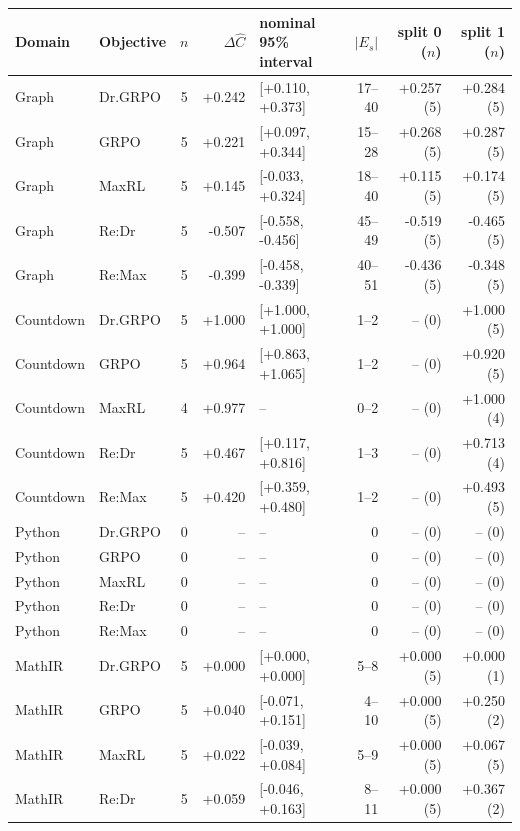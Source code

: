 \begin{table}[!htbp]
\centering
\scriptsize
\setlength{\tabcolsep}{3pt}
\begin{tabular}{@{}llcrlrrr@{}}
\toprule
Domain & Objective & $n$ & $\Delta\widehat C$ & nominal 95\% interval & $|E_s|$ & split 0 ($n$) & split 1 ($n$) \\
\midrule
Graph & Dr.GRPO & 5 & +0.242 & [+0.110, +0.373] & 17--40 & +0.257 (5) & +0.284 (5) \\
Graph & GRPO & 5 & +0.221 & [+0.097, +0.344] & 15--28 & +0.268 (5) & +0.287 (5) \\
Graph & MaxRL & 5 & +0.145 & [-0.033, +0.324] & 18--40 & +0.115 (5) & +0.174 (5) \\
Graph & Re:Dr & 5 & -0.507 & [-0.558, -0.456] & 45--49 & -0.519 (5) & -0.465 (5) \\
Graph & Re:Max & 5 & -0.399 & [-0.458, -0.339] & 40--51 & -0.436 (5) & -0.348 (5) \\
Countdown & Dr.GRPO & 5 & +1.000 & [+1.000, +1.000] & 1--2 & -- (0) & +1.000 (5) \\
Countdown & GRPO & 5 & +0.964 & [+0.863, +1.065] & 1--2 & -- (0) & +0.920 (5) \\
Countdown & MaxRL & 4 & +0.977 & -- & 0--2 & -- (0) & +1.000 (4) \\
Countdown & Re:Dr & 5 & +0.467 & [+0.117, +0.816] & 1--3 & -- (0) & +0.713 (4) \\
Countdown & Re:Max & 5 & +0.420 & [+0.359, +0.480] & 1--2 & -- (0) & +0.493 (5) \\
Python & Dr.GRPO & 0 & -- & -- & 0 & -- (0) & -- (0) \\
Python & GRPO & 0 & -- & -- & 0 & -- (0) & -- (0) \\
Python & MaxRL & 0 & -- & -- & 0 & -- (0) & -- (0) \\
Python & Re:Dr & 0 & -- & -- & 0 & -- (0) & -- (0) \\
Python & Re:Max & 0 & -- & -- & 0 & -- (0) & -- (0) \\
MathIR & Dr.GRPO & 5 & +0.000 & [+0.000, +0.000] & 5--8 & +0.000 (5) & +0.000 (1) \\
MathIR & GRPO & 5 & +0.040 & [-0.071, +0.151] & 4--10 & +0.000 (5) & +0.250 (2) \\
MathIR & MaxRL & 5 & +0.022 & [-0.039, +0.084] & 5--9 & +0.000 (5) & +0.067 (5) \\
MathIR & Re:Dr & 5 & +0.059 & [-0.046, +0.163] & 8--11 & +0.000 (5) & +0.367 (2) \\

\end{tabular}
\end{table}
